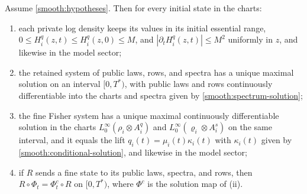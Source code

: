 Assume \cref{smooth:hypotheses}. Then for every initial state in the charts:
\begin{enumerate}
\item[(i)] each private log density keeps its values in its initial essential range, $0\leq H_i^q(z,t)\leq H_i^q(z,0)\leq M$, and $|\partial_tH_i^q(z,t)|\leq M^2$ uniformly in $z$, and likewise in the model sector;
\item[(ii)] the retained system of public laws, rows, and spectra has a unique maximal solution on an interval $[0,T^*)$, with public laws and rows continuously differentiable into the charts and spectra given by \cref{smooth:spectrum-solution};
\item[(iii)] the fine Fisher system has a unique maximal continuously differentiable solution in the charts $L^\infty_0(\rho_i\otimes A_i^q)$ and $L^\infty_0(\varrho_i\otimes A_i^s)$ on the same interval, and it equals the lift $q_i(t)=\mu_i(t)\kappa_i(t)$ with $\kappa_i(t)$ given by \cref{smooth:conditional-solution}, and likewise in the model sector;
\item[(iv)] if $R$ sends a fine state to its public laws, spectra, and rows, then $R\circ\Phi_t=\Phi_t^c\circ R$ on $[0,T^*)$, where $\Phi^c$ is the solution map of (ii).
\end{enumerate}
